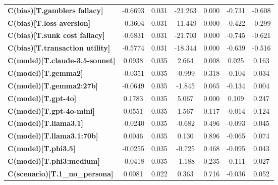\begin{center}
\begin{tabular}{lcccccc}
\textbf{C(bias)[T.gamblers fallacy]}      &      -0.6693  &        0.031     &   -21.263  &         0.000        &       -0.731    &       -0.608     \\
\textbf{C(bias)[T.loss aversion]}         &      -0.3604  &        0.031     &   -11.449  &         0.000        &       -0.422    &       -0.299     \\
\textbf{C(bias)[T.sunk cost fallacy]}     &      -0.6831  &        0.031     &   -21.703  &         0.000        &       -0.745    &       -0.621     \\
\textbf{C(bias)[T.transaction utility]}   &      -0.5774  &        0.031     &   -18.344  &         0.000        &       -0.639    &       -0.516     \\
\textbf{C(model)[T.claude-3.5-sonnet]}    &       0.0938  &        0.035     &     2.664  &         0.008        &        0.025    &        0.163     \\
\textbf{C(model)[T.gemma2]}               &      -0.0351  &        0.035     &    -0.999  &         0.318        &       -0.104    &        0.034     \\
\textbf{C(model)[T.gemma2:27b]}           &      -0.0649  &        0.035     &    -1.845  &         0.065        &       -0.134    &        0.004     \\
\textbf{C(model)[T.gpt-4o]}               &       0.1783  &        0.035     &     5.067  &         0.000        &        0.109    &        0.247     \\
\textbf{C(model)[T.gpt-4o-mini]}          &       0.0551  &        0.035     &     1.567  &         0.117        &       -0.014    &        0.124     \\
\textbf{C(model)[T.llama3.1]}             &      -0.0240  &        0.035     &    -0.682  &         0.496        &       -0.093    &        0.045     \\
\textbf{C(model)[T.llama3.1:70b]}         &       0.0046  &        0.035     &     0.130  &         0.896        &       -0.065    &        0.074     \\
\textbf{C(model)[T.phi3.5]}               &      -0.0255  &        0.035     &    -0.725  &         0.468        &       -0.095    &        0.043     \\
\textbf{C(model)[T.phi3:medium]}          &      -0.0418  &        0.035     &    -1.188  &         0.235        &       -0.111    &        0.027     \\
\textbf{C(scenario)[T.1\_no\_persona]}    &       0.0081  &        0.022     &     0.363  &         0.716        &       -0.036    &        0.052     \\

\end{tabular}
\end{center}
